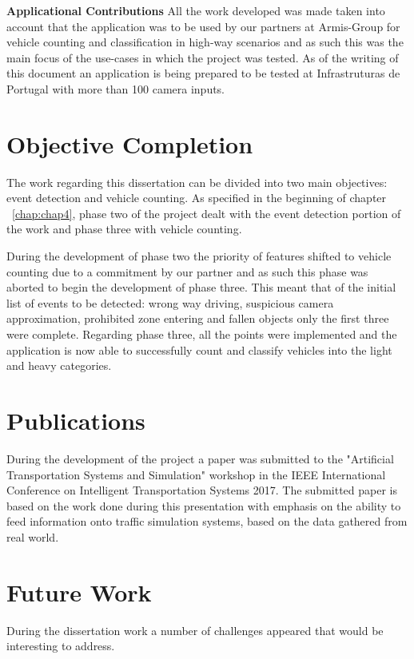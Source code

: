 \textbf{Applicational Contributions} All the work developed was made taken into account that the application was to be used by our partners at Armis-Group for vehicle counting and classification in high-way scenarios and as such this was the main focus of the use-cases in which the project was tested. As of the writing of this document an application is being prepared to be tested at Infrastruturas de Portugal with more than 100 camera inputs.

\section{Objective Completion}

The work regarding this dissertation can be divided into two main objectives: event detection and vehicle counting. As specified in the beginning of chapter ~\ref{chap:chap4}, phase two of the project dealt with the event detection portion of the work and phase three with vehicle counting.

During the development of phase two the priority of features shifted to vehicle counting due to a commitment by our partner and as such this phase was aborted to begin the development of phase three. This meant that of the initial list of events to be detected: wrong way driving, suspicious camera approximation, prohibited zone entering and fallen objects only the first three were complete. Regarding phase three, all the points were implemented and the application is now able to successfully count and classify vehicles into the light and heavy categories.

\section{Publications}\label{sec:publications}
During the development of the project a paper was submitted to the "Artificial Transportation Systems and Simulation" workshop in the IEEE International Conference on Intelligent Transportation Systems 2017. The submitted paper is based on the work done during this presentation with emphasis on the ability to feed information onto traffic simulation systems, based on the data gathered from real world.

\section{Future Work}

During the dissertation work a number of challenges appeared that would be interesting to address.


